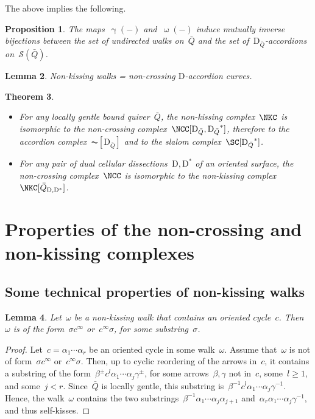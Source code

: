 \documentclass{amsart}
\newtheorem{theorem}{Theorem}[section]
\newtheorem{proposition}[theorem]{Proposition}
\newtheorem{lemma}[theorem]{Lemma}
\theoremstyle{definition}
\newcommand{\walk}{\operatorname{\omega}} %
\newcommand{\surface}{\mathcal{S}} %
\newcommand{\dual}{^*} %
\newcommand{\dissection}{\mathrm{D}} %
\newcommand{\curveof}{\operatorname{\gamma}} %
\begin{document}
The above implies the following.

\begin{proposition}
\label{prop:walks=arcs}
The maps~$\curveof(-)$ and~$\walk(-)$ induce mutually inverse bijections between the set of undirected walks on~$\bar Q$ and the set of~$\dissection_{\bar Q}$-accordions on~$\surface(\bar Q)$.
\end{proposition}

\begin{lemma}
\label{lem:nonKissing=nonCrossing}
Non-kissing walks = non-crossing $\dissection$-accordion curves.
\end{lemma}

\begin{theorem}
\label{thm:complexesCoincide}
\begin{itemize}
\item For any locally gentle bound quiver~$\bar Q$, the non-kissing complex~$\NKC$ is isomorphic to the non-crossing complex~$\NCC[\dissection_{\bar Q}, {\dissection_{\bar Q}}\dual]$, therefore to the accordion complex~$\AC[\dissection_{\bar Q}]$ and to the slalom complex~$\SC[{\dissection_{\bar Q}}\dual]$.
\item For any pair of dual cellular dissections~$\dissection, \dissection\dual$ of an oriented surface, the non-crossing complex~$\NCC$ is isomorphic to the non-kissing complex~$\NKC[\bar Q_{\dissection, \dissection\dual}]$.
\end{itemize}
\end{theorem}

\section{Properties of the non-crossing and non-kissing complexes}

\subsection{Some technical properties of non-kissing walks}

\begin{lemma}\label{lem:nkCycles}
 Let~$\omega$ be a non-kissing walk that contains an oriented cycle~$c$.
 Then~$\omega$ is of the form~$\sigma c^\infty$ or~$c^\infty\sigma$, for some substring~$\sigma$.
\end{lemma}

\begin{proof}
 Let~$c=\alpha_1\cdots\alpha_r$ be an oriented cycle in some walk~$\omega$.
 Assume that~$\omega$ is not of form~$\sigma c^\infty$ or~$c^\infty\sigma$.
 Then, up to cyclic reordering of the arrows in~$c$, it contains a substring of the form~$\beta^\pm c^l \alpha_1\cdots\alpha_j\gamma^\pm$, for some arrows~$\beta,\gamma$ not in~$c$, some~$l\geq 1$, and some~$j<r$.
 Since~$\bar Q$ is locally gentle, this substring is~$\beta^{-1} c^l \alpha_1\cdots\alpha_j\gamma^{-1}$.
 Hence, the walk~$\omega$ contains the two substrings~$\beta^{-1}\alpha_1\cdots\alpha_j\alpha_{j+1}$ and~$\alpha_r\alpha_1\cdots\alpha_j\gamma^{-1}$, and thus self-kisses.
\end{proof}
\end{document}
